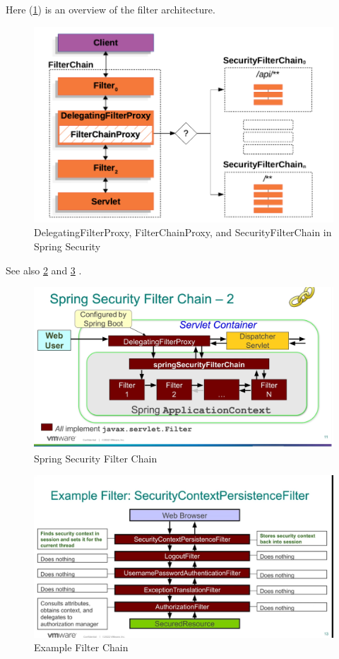 \documentclass{scrartcl}
\begin{document}
Here (\ref{fig:filters}) is an overview of the filter architecture.

\begin{figure}[h!]
    \centering
    \includegraphics[width=1\linewidth]{filters}
    \caption{DelegatingFilterProxy, FilterChainProxy, and SecurityFilterChain in Spring Security }
    \label{fig:filters}
\end{figure}

See also \ref{fig:filter-chain} and \ref{fig:filter-chain-example}
.
\begin{figure}[h]
    \centering
    \includegraphics[width=1\linewidth]{filter-chain}
    \caption{Spring Security Filter Chain}
    \label{fig:filter-chain}
\end{figure}

\begin{figure} [h]
    \centering
    \includegraphics[width=1\linewidth]{filter-chain-example}
    \caption{Example Filter Chain}
    \label{fig:filter-chain-example}
\end{figure}
\end{document}
